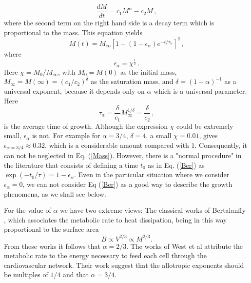 \documentclass[10pt]{iopart}
\begin{document}
\begin{equation}
\frac{dM}{dt} =c_1 M^{\alpha}-c_2 M\,,
\label{dM}
\end{equation}
where the second term on the right hand side  is a decay term which is proportional to the mass.
 This equation yields
\begin{equation}
M(t) = M_\infty \left[ 1 -(1-\epsilon_{\alpha}) e^{-t/\tau_\alpha} \right]^\delta\,,
\label{Mass}
\end{equation}
where
\begin{equation}
\epsilon_{\alpha} =  \chi^{\frac{1}{\delta}}\,.
\label{epsilon}
\end{equation}
Here $\chi=M_0/M_\infty$, with $M_0=M(0)$ as the initial mass, $M_\infty = M(\infty)=(c_1/c_2)^\delta$ as the saturation mass, and  $\delta = (1-\alpha)^{-1}$ as a universal exponent, because it depends only on $\alpha$ which is a universal parameter. Here
\begin{equation}
\label{tau}
\tau_{\alpha} =  \frac{\delta}{ c_1} M_\infty^{1/\delta}= \frac{\delta}{c_2}\,,
\end{equation}
is the average time of growth.   Although the expression $\chi$ could be extremely small,
$\epsilon_\alpha$ is not. For example for $\alpha=3/4$, $\delta=4$, a small $ \chi=0.01$, gives $\epsilon_{\alpha=3/4} \approx 0.32$,  which is a considerable amount compared with $1$. Consequently, it can not be neglected in Eq. (\ref{Mass}). However, there is  a "normal procedure" in the literature that consists of defining a time $t_0$ as in Eq. (\ref{Ber}) as $\exp(-t_0/\tau)=1-\epsilon_\alpha$. Even in the particular situation where we  consider $\epsilon_{\alpha}=0$, we can not consider  Eq (\ref{Ber}) as a good way to describe the growth phenomena, as we shall see below.

For the value of $\alpha$ we have two extreme views: The classical works of  Bertalanffy  \cite{Bertalanffy38a,Bertalanffy57}, which associates the metabolic rate to heat dissipation, being in this way proportional to the surface area
\begin{equation}
B \propto V^{2/3} \propto M^{2/3}.
\end{equation}
From these works it follows that $\alpha=2/3$. The works of West et al \cite{West97,West99,Brown05} attribute the metabolic rate to the energy necessary to feed each cell through the cardiovascular network. Their work suggest that the allotropic exponents should be multiples of $1/4$ and that $\alpha=3/4$. 
\end{document}
